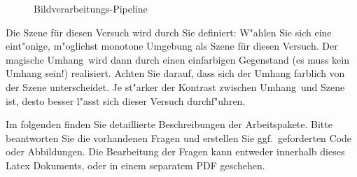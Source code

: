\begin{figure}
\begin{tikzpicture}[node distance = 2cm, auto]
\end{tikzpicture}
\caption{Bildverarbeitungs-Pipeline}
\label{fig:skizzepipeline}
\end{figure}

Die Szene f\"ur diesen Versuch wird durch Sie definiert: W"ahlen Sie sich eine eint"onige, m"oglichst monotone  Umgebung als Szene f\"ur diesen Versuch. Der \glqq magische Umhang\grqq\ wird dann durch einen einfarbigen Gegenstand (es muss kein Umhang sein!) realisiert. Achten Sie darauf, dass sich der Umhang farblich von der Szene unterscheidet. Je st"arker der Kontrast zwischen \glqq Umhang\grqq\ und Szene ist, desto besser l"asst sich dieser Versuch durchf"uhren.  


Im folgenden finden Sie detaillierte Beschreibungen der Arbeitspakete. Bitte beantworten Sie die vorhandenen Fragen und erstellen Sie ggf.\ geforderten Code oder Abbildungen. Die Bearbeitung der Fragen kann entweder innerhalb dieses Latex Dokuments, oder in einem separatem PDF geschehen. 



